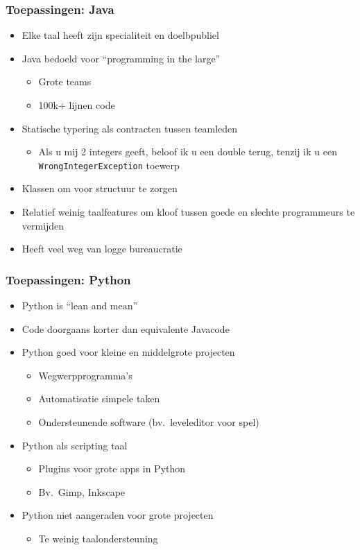 \begin{frame}
  \frametitle{Toepassingen: Java}
  \begin{itemize}
    \item Elke taal heeft zijn specialiteit en doelbpubliel
    \item Java bedoeld voor ``programming in the large''
          \begin{itemize}
            \item Grote teams
            \item 100k+ lijnen code
          \end{itemize}
    \item Statische typering als contracten tussen teamleden
          \begin{itemize}
            \item Als u mij 2 integers geeft, beloof ik u een double terug, tenzij ik u een
                  \texttt{WrongIntegerException} toewerp
          \end{itemize}
    \item Klassen om voor structuur te zorgen
    \item Relatief weinig taalfeatures om kloof tussen goede en slechte programmeurs te vermijden
    \item Heeft veel weg van logge bureaucratie
  \end{itemize}
\end{frame}

\begin{frame}
  \frametitle{Toepassingen: Python}
  \begin{itemize}
    \item Python is ``lean and mean''
    \item Code doorgaans korter dan equivalente Javacode
    \item Python goed voor kleine en middelgrote projecten
          \begin{itemize}
            \item Wegwerpprogramma's
            \item Automatisatie simpele taken
            \item Ondersteunende software (bv.~leveleditor voor spel)
          \end{itemize}
    \item Python als scripting taal
          \begin{itemize}
            \item Plugins voor grote apps in Python
            \item Bv.~Gimp, Inkscape
          \end{itemize}
    \item Python niet aangeraden voor grote projecten
          \begin{itemize}
            \item Te weinig taalondersteuning
          \end{itemize}
  \end{itemize}
\end{frame}



